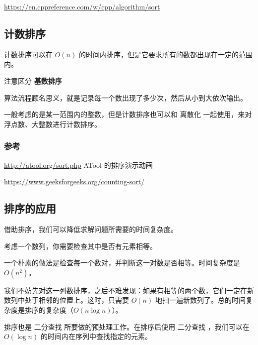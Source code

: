 \url{https://en.cppreference.com/w/cpp/algorithm/sort}

\subsection{计数排序}

计数排序可以在 $O(n)$ 的时间内排序，但是它要求所有的数都出现在一定的范围内。

\begin{NOTE}{}{}
注意区分 \textbf{ 基数排序 }

\end{NOTE}


算法流程顾名思义，就是记录每一个数出现了多少次，然后从小到大依次输出。

一般考虑的是某一范围内的整数，但是计数排序也可以和  离散化  一起使用，来对浮点数、大整数进行计数排序。

\subsubsection{参考}

\url{http://atool.org/sort.php} ATool 的排序演示动画  

\url{https://www.geeksforgeeks.org/counting-sort/}   

\subsection{排序的应用}

借助排序，我们可以降低求解问题所需要的时间复杂度。

考虑一个数列，你需要检查其中是否有元素相等。

一个朴素的做法是检查每一个数对，并判断这一对数是否相等。时间复杂度是 $O(n^2)$。

我们不妨先对这一列数排序，之后不难发现：如果有相等的两个数，它们一定在新数列中处于相邻的位置上。这时，只需要 $O(n)$ 地扫一遍新数列了。总的时间复杂度是排序的复杂度（$O(n\log n)$）。

排序也是  二分查找  所要做的预处理工作。在排序后使用  二分查找 ，我们可以在 $O(\log n)$ 的时间内在序列中查找指定的元素。
